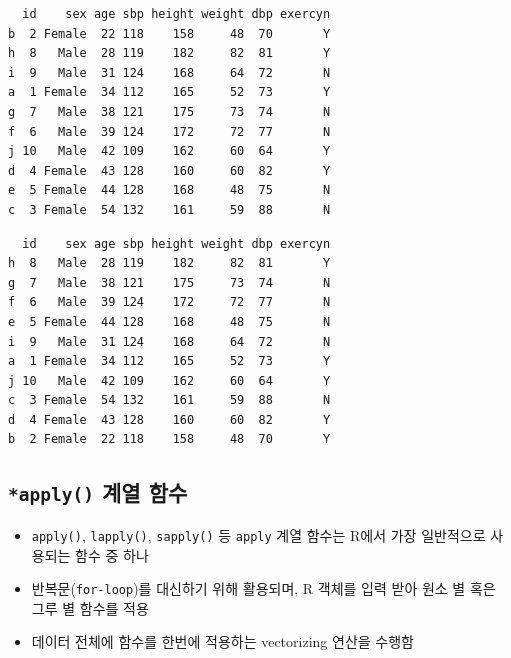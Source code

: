 \documentclass[
  11pt,
]{krantz}
\newenvironment{Shaded}{\begin{snugshade}}{\end{snugshade}}
\newcommand{\AttributeTok}[1]{\textcolor[rgb]{0.61,0.61,0.61}{#1}}
\newcommand{\CommentTok}[1]{\textcolor[rgb]{0.37,0.37,0.37}{\textit{#1}}}
\newcommand{\FunctionTok}[1]{\textcolor[rgb]{0,0,0}{#1}}
\newcommand{\NormalTok}[1]{#1}
\newcommand{\SpecialCharTok}[1]{\textcolor[rgb]{0,0,0}{#1}}
\providecommand{\tightlist}{%
  \setlength{\itemsep}{0pt}\setlength{\parskip}{0pt}}
\begin{document}
\begin{verbatim}
  id    sex age sbp height weight dbp exercyn
b  2 Female  22 118    158     48  70       Y
h  8   Male  28 119    182     82  81       Y
i  9   Male  31 124    168     64  72       N
a  1 Female  34 112    165     52  73       Y
g  7   Male  38 121    175     73  74       N
f  6   Male  39 124    172     72  77       N
j 10   Male  42 109    162     60  64       Y
d  4 Female  43 128    160     60  82       Y
e  5 Female  44 128    168     48  75       N
c  3 Female  54 132    161     59  88       N
\end{verbatim}

\begin{Shaded}
\end{Shaded}

\begin{verbatim}
  id    sex age sbp height weight dbp exercyn
h  8   Male  28 119    182     82  81       Y
g  7   Male  38 121    175     73  74       N
f  6   Male  39 124    172     72  77       N
e  5 Female  44 128    168     48  75       N
i  9   Male  31 124    168     64  72       N
a  1 Female  34 112    165     52  73       Y
j 10   Male  42 109    162     60  64       Y
c  3 Female  54 132    161     59  88       N
d  4 Female  43 128    160     60  82       Y
b  2 Female  22 118    158     48  70       Y
\end{verbatim}

\normalsize

\hypertarget{apply-related-fun}{%
\subsection{\texorpdfstring{\texttt{*apply()} 계열 함수}{*apply() 계열 함수}}\label{apply-related-fun}}

\begin{itemize}
\tightlist
\item
  \texttt{apply()}, \texttt{lapply()}, \texttt{sapply()} 등 \texttt{apply} 계열 함수는 R에서 가장 일반적으로 사용되는 함수 중 하나
\item
  반복문(\texttt{for-loop})를 대신하기 위해 활용되며, R 객체를 입력 받아 원소 별 혹은 그루 별 함수를 적용
\item
  데이터 전체에 함수를 한번에 적용하는 vectorizing 연산을 수행함
\end{itemize}
\end{document}
